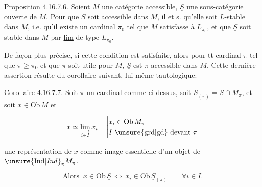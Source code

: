 


\uline{Proposition} 4.16.7.6. Soient $M$ une catégorie accessible, $\underline S$ une sous-catégorie \uline{ouverte} de $M$. Pour que $\underline S$ soit accessible dans $M$, il  et s. qu'elle soit $\underline L$-stable dans $M$, i.e. qu'il existe un cardinal $\pi_0$ tel que $M$ satisfasse à $L_{\pi_0}$, et que $\underline S$ soit stable dans $M$ par \uline{lim} de type $L_{\pi_0}$.

De façon plus précise, si cette condition est satisfaite, alors pour tt cardinal $\pi$ tel que $\pi\geq\pi_0$ et que $\pi$ soit utile pour $M$, $\underline S$ est $\pi$-accessible dans $M$.  Cette dernière assertion résulte du  corollaire suivant, lui-même tautologique:

\uline{Corollaire} 4.16.7.7. Soit $\pi$ un cardinal comme  ci-dessus,  soit $\underline S_{(\pi)}=\underline S\cap M_\pi$, et soit $x\in\mathrm{Ob}\,M$ et

\[
x\simeq\varinjlim_{i\in I}x_i
\quad\left|\begin{aligned}
 &x_i\in\mathrm{Ob}\,M_\pi\\
 &I\ \text{\unsure{grd|gd} devant }\pi
\end{aligned}\right.
\]

une représentation de $x$ comme \deleted{$\varinjlim$} image essentielle d'un objet de $\unsure{\mathrm{Ind}|\mathit{Ind}}_\pi M_\pi$.

\[\text{Alors }\ x\in\mathrm{Ob}\,\underline S\ \Longleftrightarrow\ x_i\in\mathrm{Ob}\,\underline S_{(\pi)}\qquad\forall i\in I .\]

